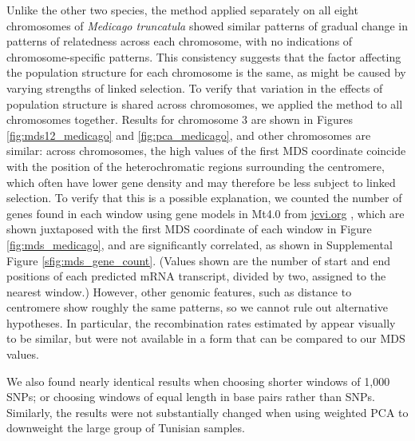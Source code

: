 \documentclass[11pt, oneside]{article}   	%
\begin{document}
Unlike the other two species,
the method applied separately on all eight chromosomes of \textit{Medicago truncatula} 
showed similar patterns of gradual change in patterns of relatedness across each chromosome,
with no indications of chromosome-specific patterns.
This consistency suggests that the factor affecting the population structure for each chromosome is the same,
as might be caused by varying strengths of linked selection.
To verify that variation in the effects of population structure is shared across chromosomes,
we applied the method to all chromosomes together.
Results for chromosome 3 are shown in Figures \ref{fig:mds12_medicago} and \ref{fig:pca_medicago},
and other chromosomes are similar:
across chromosomes, the high values of the first MDS coordinate coincide with the position of the heterochromatic regions surrounding the centromere,
which often have lower gene density and may therefore be less subject to linked selection.
To verify that this is a possible explanation,
we counted the number of genes found in each window using gene models in Mt4.0 from \url{jcvi.org} \citep{tang2014improved},
which are shown juxtaposed with
the first MDS coordinate of each window in Figure \ref{fig:mds_medicago},
and are significantly correlated, as shown in Supplemental Figure \ref{sfig:mds_gene_count}.
(Values shown are the number of start and end positions of each predicted mRNA transcript,
divided by two, assigned to the nearest window.)
However, other genomic features, such as distance to centromere show roughly the same patterns,
so we cannot rule out alternative hypotheses.
In particular, the recombination rates estimated by \citet{paape2012finescale} appear visually to be similar,
but were not available in a form that can be compared to our MDS values.

We also found nearly identical results when choosing shorter windows of 1,000 SNPs;
or choosing windows of equal length in base pairs rather than SNPs.
Similarly, the results were not substantially changed
when using weighted PCA to downweight the large group of Tunisian samples.
\end{document}
